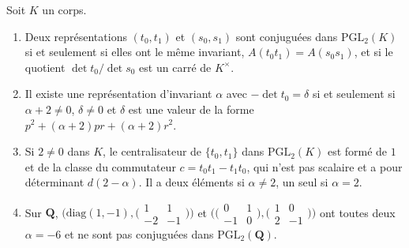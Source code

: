 \begin{enonce}
Soit $K$ un corps.
\begin{enumerate}
\item Deux représentations $(t_0, t_1)$ et $(s_0, s_1)$ sont conjuguées dans $\mathrm{PGL}_2(K)$ si et seulement si elles ont le même invariant, $A(t_0t_1) = A(s_0s_1)$, et si le quotient $\det t_0 / \det s_0$ est un carré de $K^\times$.
\item Il existe une représentation d'invariant $\alpha$ avec $-\det t_0 = \delta$ si et seulement si $\alpha + 2 \neq 0$, $\delta \neq 0$ et $\delta$ est une valeur de la forme $p^2 + (\alpha + 2)pr + (\alpha + 2)r^2$.
\item Si $2 \neq 0$ dans $K$, le centralisateur de $\{t_0, t_1\}$ dans $\mathrm{PGL}_2(K)$ est formé de $1$ et de la classe du commutateur $c = t_0t_1 - t_1t_0$, qui n'est pas scalaire et a pour déterminant $d(2 - \alpha)$. Il a deux éléments si $\alpha \neq 2$, un seul si $\alpha = 2$.
\item Sur $\mathbf Q$, $\big(\mathrm{diag}(1, -1), \bigl(\begin{smallmatrix} 1 & 1 \\ -2 & -1 \end{smallmatrix}\bigr)\big)$ et $\big(\bigl(\begin{smallmatrix} 0 & 1 \\ -1 & 0 \end{smallmatrix}\bigr), \bigl(\begin{smallmatrix} 1 & 0 \\ 2 & -1 \end{smallmatrix}\bigr)\big)$ ont toutes deux $\alpha = -6$ et ne sont pas conjuguées dans $\mathrm{PGL}_2(\mathbf Q)$.
\end{enumerate}
\end{enonce}

